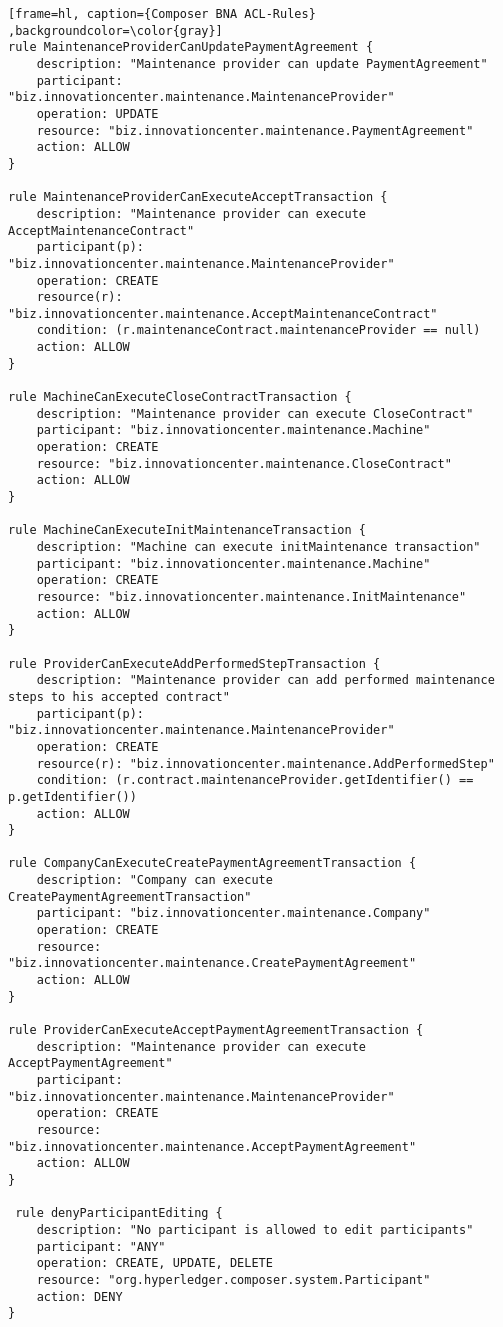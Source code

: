 \begin{appendices}
\begin{lstlisting}[frame=hl, caption={Composer BNA ACL-Rules} ,backgroundcolor=\color{gray}]
rule MaintenanceProviderCanUpdatePaymentAgreement {
    description: "Maintenance provider can update PaymentAgreement"
    participant: "biz.innovationcenter.maintenance.MaintenanceProvider"
    operation: UPDATE
    resource: "biz.innovationcenter.maintenance.PaymentAgreement"
    action: ALLOW
}

rule MaintenanceProviderCanExecuteAcceptTransaction {
    description: "Maintenance provider can execute AcceptMaintenanceContract"
    participant(p): "biz.innovationcenter.maintenance.MaintenanceProvider"
    operation: CREATE
    resource(r): "biz.innovationcenter.maintenance.AcceptMaintenanceContract"
    condition: (r.maintenanceContract.maintenanceProvider == null)
    action: ALLOW
}

rule MachineCanExecuteCloseContractTransaction {
    description: "Maintenance provider can execute CloseContract"
    participant: "biz.innovationcenter.maintenance.Machine"
    operation: CREATE
    resource: "biz.innovationcenter.maintenance.CloseContract"
    action: ALLOW
}

rule MachineCanExecuteInitMaintenanceTransaction {
    description: "Machine can execute initMaintenance transaction"
    participant: "biz.innovationcenter.maintenance.Machine"
    operation: CREATE
    resource: "biz.innovationcenter.maintenance.InitMaintenance"
    action: ALLOW
}

rule ProviderCanExecuteAddPerformedStepTransaction {
    description: "Maintenance provider can add performed maintenance steps to his accepted contract"
    participant(p): "biz.innovationcenter.maintenance.MaintenanceProvider"
    operation: CREATE
    resource(r): "biz.innovationcenter.maintenance.AddPerformedStep"
    condition: (r.contract.maintenanceProvider.getIdentifier() == p.getIdentifier())
    action: ALLOW
}

rule CompanyCanExecuteCreatePaymentAgreementTransaction {
    description: "Company can execute CreatePaymentAgreementTransaction"
    participant: "biz.innovationcenter.maintenance.Company"
    operation: CREATE
    resource: "biz.innovationcenter.maintenance.CreatePaymentAgreement"
    action: ALLOW
}

rule ProviderCanExecuteAcceptPaymentAgreementTransaction {
    description: "Maintenance provider can execute AcceptPaymentAgreement"
    participant: "biz.innovationcenter.maintenance.MaintenanceProvider"
    operation: CREATE
    resource: "biz.innovationcenter.maintenance.AcceptPaymentAgreement"
    action: ALLOW
}

 rule denyParticipantEditing {
    description: "No participant is allowed to edit participants"
    participant: "ANY"
    operation: CREATE, UPDATE, DELETE
    resource: "org.hyperledger.composer.system.Participant"
    action: DENY
}


\end{lstlisting}
\end{appendices}
